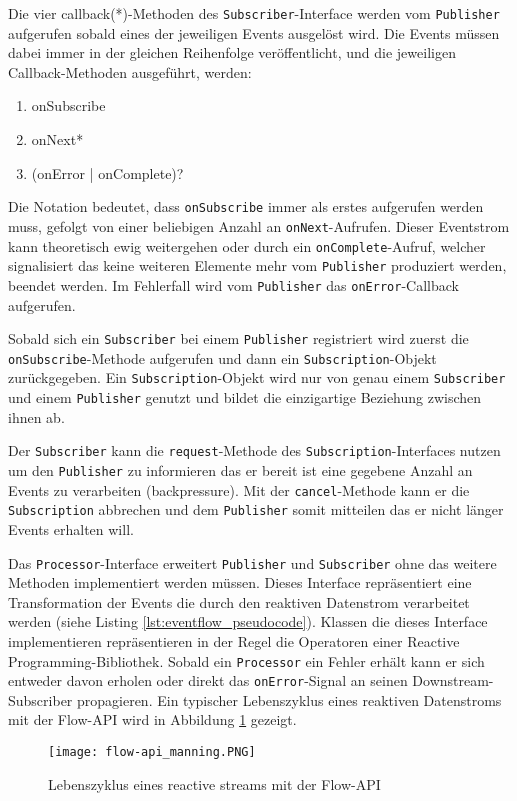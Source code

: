 Die vier \gls{callback}(*)-Methoden des \verb|Subscriber|-Interface werden vom \verb|Publisher| aufgerufen sobald eines der jeweiligen Events ausgelöst wird.
Die Events müssen dabei immer in der gleichen Reihenfolge veröffentlicht, und die jeweiligen Callback-Methoden ausgeführt, werden:
\begin{enumerate}
  \item onSubscribe
  \item onNext*
  \item (onError | onComplete)?
\end{enumerate}
Die Notation bedeutet, dass \verb|onSubscribe| immer als erstes aufgerufen werden muss, gefolgt von einer beliebigen Anzahl an
\verb|onNext|-Aufrufen. Dieser Eventstrom kann theoretisch ewig weitergehen oder durch ein \verb|onComplete|-Aufruf, welcher
signalisiert das keine weiteren Elemente mehr vom \verb|Publisher| produziert werden, beendet werden.
Im Fehlerfall wird vom \verb|Publisher| das \verb|onError|-Callback aufgerufen.

Sobald sich ein \verb|Subscriber| bei einem \verb|Publisher| registriert wird zuerst die \verb|onSubscribe|-Methode aufgerufen und dann ein
\verb|Subscription|-Objekt zurückgegeben. Ein \verb|Subscription|-Objekt wird nur von genau einem \verb|Subscriber| und einem \verb|Publisher| genutzt
und bildet die einzigartige Beziehung zwischen ihnen ab.

Der \verb|Subscriber| kann die \verb|request|-Methode des \verb|Subscription|-Interfaces nutzen um den \verb|Publisher| zu informieren das er bereit
ist eine gegebene Anzahl an Events zu verarbeiten (backpressure). Mit der \verb|cancel|-Methode kann er die \verb|Subscription| abbrechen und dem \verb|Publisher|
somit mitteilen das er nicht länger Events erhalten will.
\parencite{OracleFlow}

Das \verb|Processor|-Interface erweitert \verb|Publisher| und \verb|Subscriber| ohne das weitere Methoden implementiert werden müssen.
Dieses Interface repräsentiert eine Transformation der Events die durch den
reaktiven Datenstrom verarbeitet werden (siehe Listing \ref{lst:eventflow_pseudocode}).
Klassen die dieses Interface implementieren repräsentieren in der Regel die Operatoren einer Reactive Programming-Bibliothek.
Sobald ein \verb|Processor| ein Fehler erhält kann er sich entweder davon erholen oder direkt das \verb|onError|-Signal an seinen
Downstream-Subscriber propagieren. Ein typischer Lebenszyklus eines reaktiven Datenstroms mit der Flow-API wird in
Abbildung \ref{fig:flow-api} gezeigt.
\begin{figure}[ht!]
  \centering
  \texttt{[image: flow-api\_manning.PNG]}
  \caption{Lebenszyklus eines reactive streams mit der Flow-API \parencite[Kapitel 17,  Figure 17.3]{JavaInAction}}
  \label{fig:flow-api}
\end{figure}
\newpage


